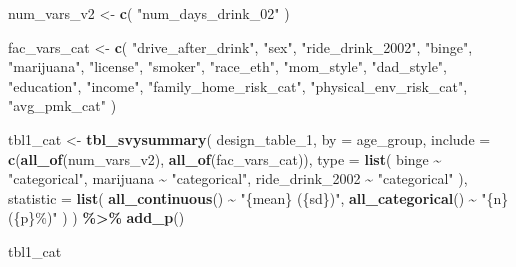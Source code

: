 \documentclass[
]{article}
\newenvironment{Shaded}{\begin{snugshade}}{\end{snugshade}}
\newcommand{\AttributeTok}[1]{\textcolor[rgb]{0.13,0.29,0.53}{#1}}
\newcommand{\FunctionTok}[1]{\textcolor[rgb]{0.13,0.29,0.53}{\textbf{#1}}}
\newcommand{\NormalTok}[1]{#1}
\newcommand{\OtherTok}[1]{\textcolor[rgb]{0.56,0.35,0.01}{#1}}
\newcommand{\SpecialCharTok}[1]{\textcolor[rgb]{0.81,0.36,0.00}{\textbf{#1}}}
\newcommand{\StringTok}[1]{\textcolor[rgb]{0.31,0.60,0.02}{#1}}
\begin{document}
\begin{Shaded}
\begin{Highlighting}[]
\NormalTok{num\_vars\_v2 }\OtherTok{\textless{}{-}} \FunctionTok{c}\NormalTok{(}
  \StringTok{"num\_days\_drink\_02"}
\NormalTok{)}

\NormalTok{fac\_vars\_cat }\OtherTok{\textless{}{-}} \FunctionTok{c}\NormalTok{(}
  \StringTok{"drive\_after\_drink"}\NormalTok{, }\StringTok{"sex"}\NormalTok{,}
  \StringTok{"ride\_drink\_2002"}\NormalTok{, }\StringTok{"binge"}\NormalTok{, }\StringTok{"marijuana"}\NormalTok{,}
  \StringTok{"license"}\NormalTok{, }\StringTok{"smoker"}\NormalTok{, }\StringTok{"race\_eth"}\NormalTok{, }\StringTok{"mom\_style"}\NormalTok{,}
  \StringTok{"dad\_style"}\NormalTok{, }\StringTok{"education"}\NormalTok{, }\StringTok{"income"}\NormalTok{, }\StringTok{"family\_home\_risk\_cat"}\NormalTok{, }\StringTok{"physical\_env\_risk\_cat"}\NormalTok{,}
  \StringTok{"avg\_pmk\_cat"}
\NormalTok{) }

\NormalTok{tbl1\_cat }\OtherTok{\textless{}{-}} \FunctionTok{tbl\_svysummary}\NormalTok{(}
\NormalTok{  design\_table\_1,}
  \AttributeTok{by =}\NormalTok{ age\_group,}
  \AttributeTok{include =} \FunctionTok{c}\NormalTok{(}\FunctionTok{all\_of}\NormalTok{(num\_vars\_v2), }\FunctionTok{all\_of}\NormalTok{(fac\_vars\_cat)),}
  \AttributeTok{type =} \FunctionTok{list}\NormalTok{(}
\NormalTok{    binge }\SpecialCharTok{\textasciitilde{}} \StringTok{"categorical"}\NormalTok{,}
\NormalTok{    marijuana }\SpecialCharTok{\textasciitilde{}} \StringTok{"categorical"}\NormalTok{,}
\NormalTok{    ride\_drink\_2002 }\SpecialCharTok{\textasciitilde{}} \StringTok{"categorical"}
\NormalTok{  ),}
  \AttributeTok{statistic =} \FunctionTok{list}\NormalTok{(}
    \FunctionTok{all\_continuous}\NormalTok{() }\SpecialCharTok{\textasciitilde{}} \StringTok{"\{mean\} (\{sd\})"}\NormalTok{,}
    \FunctionTok{all\_categorical}\NormalTok{() }\SpecialCharTok{\textasciitilde{}} \StringTok{"\{n\} (\{p\}\%)"}
\NormalTok{  )}
\NormalTok{) }\SpecialCharTok{\%\textgreater{}\%}
  \FunctionTok{add\_p}\NormalTok{() }

\NormalTok{tbl1\_cat}
\end{Highlighting}
\end{Shaded}
\end{document}
